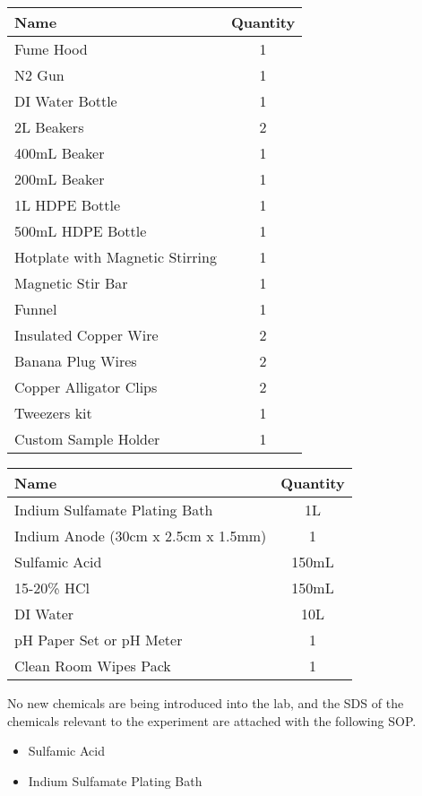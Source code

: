 \begin{center}
\begin{framed}
\begin{minipage}{0.8\textwidth}
\begin{center}
\begin{tabular}{|l|c|}
\hline
    \textbf{Name}  &   \textbf{Quantity} \\
\hline
Fume Hood                           &	1 \\
N2 Gun                              &	1 \\
DI Water Bottle                     &	1 \\
2L Beakers                          &	2 \\
400mL Beaker                        &	1 \\
200mL Beaker                        &	1 \\
1L HDPE Bottle                      &	1 \\
500mL HDPE Bottle                   &	1 \\
Hotplate with Magnetic Stirring     &	1 \\
Magnetic Stir Bar                   &   1 \\
Funnel                              &	1 \\
Insulated Copper Wire               &	2 \\
Banana Plug Wires                   &	2 \\
Copper Alligator Clips              &	2 \\
Tweezers kit                        &	1 \\
Custom Sample Holder                &	1 \\
\hline
\end{tabular}
    \vspace{0.5cm}
\begin{tabular}{|l|c|}
\hline
\textbf{Name} & \textbf{Quantity} \\
\hline
Indium Sulfamate Plating Bath        & 1L \\
Indium Anode (30cm x 2.5cm x 1.5mm)  & 1 \\
Sulfamic Acid                        & 150mL \\
15-20\% HCl                          & 150mL \\
DI Water                             & 10L \\
pH Paper Set or pH Meter             & 1 \\
Clean Room Wipes Pack                & 1 \\
\hline
\end{tabular}

\end{center}


No new chemicals are being introduced into the lab, and the SDS of the chemicals relevant to the experiment are attached with the following SOP.

\begin{itemize}
    \item Sulfamic Acid
    \item Indium Sulfamate Plating Bath
\end{itemize}

    \end{minipage}
\end{framed}
\end{center}


